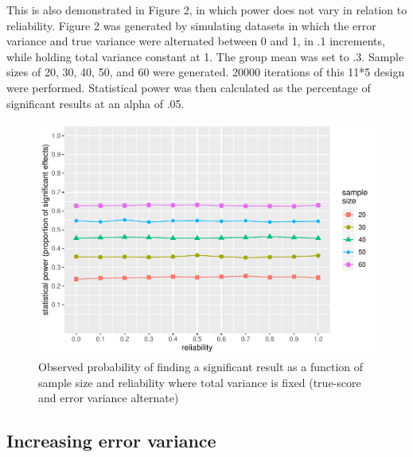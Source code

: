 \documentclass[english,,man]{apa6}
\begin{document}
This is also demonstrated in Figure 2, in which power does not vary in relation to reliability. Figure 2 was generated by simulating datasets in which the error variance and true variance were alternated between 0 and 1, in .1 increments, while holding total variance constant at 1. The group mean was set to .3. Sample sizes of 20, 30, 40, 50, and 60 were generated. 20000 iterations of this 11*5 design were performed. Statistical power was then calculated as the percentage of significant results at an alpha of .05.

\begin{figure}[H]
\includegraphics{visualising-reliability-and-power-relationships-v2_files/figure-latex/plotting2-1} \caption{Observed probability of finding a significant result as a function of sample size and reliability where total variance is fixed (true-score and error variance alternate)}\label{fig:plotting2}
\end{figure}

\hypertarget{increasing-error-variance}{%
\subsection{Increasing error variance}\label{increasing-error-variance}}
\end{document}
